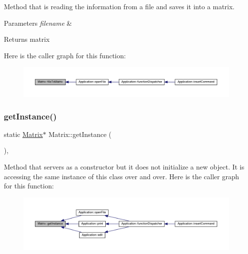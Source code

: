 Method that is reading the information from a file and saves it into a matrix. 
\begin{DoxyParams}{Parameters}
{\em filename} & \\
\hline
\end{DoxyParams}
\begin{DoxyReturn}{Returns}
matrix 
\end{DoxyReturn}
Here is the caller graph for this function\+:\nopagebreak
\begin{figure}[H]
\begin{center}
\leavevmode
\includegraphics[width=350pt]{class_matrix_a35eb9dcb01c552fea1f5926db35339ef_icgraph}
\end{center}
\end{figure}
\mbox{\label{class_matrix_a0c8e09a50ddb4d068d39456ea130abcc}} 
\subsubsection{\texorpdfstring{get\+Instance()}{getInstance()}}
{\footnotesize\ttfamily static \hyperlink{class_matrix}{Matrix}$\ast$ Matrix\+::get\+Instance (\begin{DoxyParamCaption}{ }\end{DoxyParamCaption})\hspace{0.3cm}{\ttfamily [inline]}, {\ttfamily [static]}}

Method that servers as a constructor but it does not initialize a new object. It is accessing the same instance of this class over and over. Here is the caller graph for this function\+:
\nopagebreak
\begin{figure}[H]
\begin{center}
\leavevmode
\includegraphics[width=350pt]{class_matrix_a0c8e09a50ddb4d068d39456ea130abcc_icgraph}
\end{center}
\end{figure}
\mbox{\label{class_matrix_a52d82641f52304c9b6525747cd7f960c}} 
